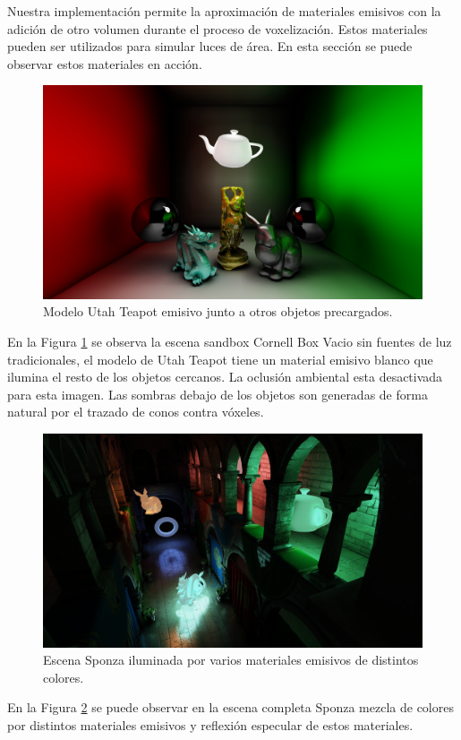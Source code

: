 Nuestra implementación permite la aproximación de materiales emisivos con la adición de otro volumen durante el proceso de voxelización. Estos materiales pueden ser utilizados para simular luces de área. En esta sección se puede observar estos materiales en acción.

\begin{figure}[H]
	\centering
	\includegraphics[width=.9\linewidth]{media/finals/area_teapot.png}
	\caption{Modelo Utah Teapot emisivo junto a otros objetos precargados.}
	\label{fig:areapot}
\end{figure}
En la Figura \ref{fig:areapot} se observa la escena sandbox Cornell Box Vacio sin fuentes de luz tradicionales, el modelo de Utah Teapot tiene un material emisivo blanco que ilumina el resto de los objetos cercanos. La oclusión ambiental esta desactivada para esta imagen. Las sombras debajo de los objetos son generadas de forma natural por el trazado de conos contra vóxeles.
\begin{figure}[H]
	\centering
	\includegraphics[width=.9\linewidth]{media/finals/area_sponza.png}
	\caption{Escena Sponza iluminada por varios materiales emisivos de distintos colores.}
	\label{fig:areasponza}
\end{figure}
En la Figura \ref{fig:areasponza} se puede observar en la escena completa Sponza mezcla de colores por distintos materiales emisivos y reflexión especular de estos materiales.
